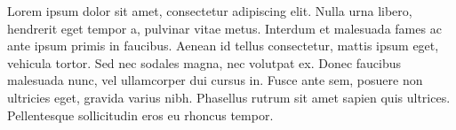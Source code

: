 
   Lorem ipsum dolor sit amet, consectetur adipiscing elit. Nulla urna libero, hendrerit eget tempor a, pulvinar vitae metus. Interdum et malesuada fames ac ante ipsum primis in faucibus. Aenean id tellus consectetur, mattis ipsum eget, vehicula tortor. Sed nec sodales magna, nec volutpat ex. Donec faucibus malesuada nunc, vel ullamcorper dui cursus in. Fusce ante sem, posuere non ultricies eget, gravida varius nibh. Phasellus rutrum sit amet sapien quis ultrices. Pellentesque sollicitudin eros eu rhoncus tempor.